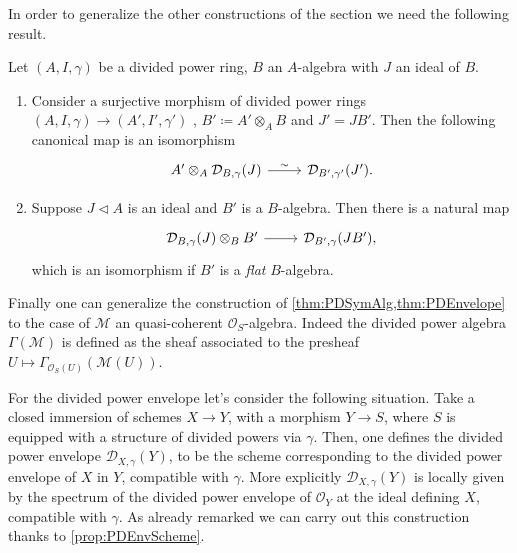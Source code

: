 \noindent
In order to generalize the other constructions of the section
we need the following result.


\begin{prop}\label{prop:PDEnvScheme}
	Let $\left(A, I, \gamma\right)$ be a divided power ring, $B$
	an $A$-algebra with $J$ an ideal of $B$.
\begin{enumerate}
	\item Consider a surjective morphism of divided power rings
		$\left(A, I, \gamma\right) \to  \left(A', I', \gamma'\right)$ ,
		$B' \coloneqq A' \otimes_A B$ and $J' = JB'$.
		Then the following canonical map is an isomorphism
		\begin{equation*}
		\begin{tikzcd}[row sep = 0ex
			,/tikz/column 1/.append style={anchor=base east}
			,/tikz/column 2/.append style={anchor=base west}]
			A' \otimes_A \mathcal{D}_{B,\gamma}(J) \arrow[r, "\sim", rightarrow] &
			\mathcal{D}_{B',\gamma'}(J')
		.\end{tikzcd}
		\end{equation*} 

	\item Suppose $J \triangleleft A$ is an ideal and $B'$ is a $B$-algebra.
		Then there is a natural map
		\begin{equation*}
		\begin{tikzcd}[row sep = 0ex
			,/tikz/column 1/.append style={anchor=base east}
			,/tikz/column 2/.append style={anchor=base west}]
			\mathcal{D}_{B,\gamma}(J) \otimes_B B' \arrow[r, "", rightarrow] &
			\mathcal{D}_{B',\gamma}(JB')
		,\end{tikzcd}
		\end{equation*} 
		which is an isomorphism if $B'$ is a \emph{flat} $B$-algebra.
\end{enumerate}
\end{prop}


\begin{rem}[]
	Finally one can generalize the construction
	of \cref{thm:PDSymAlg,thm:PDEnvelope} to the case of $\mathcal{M}$
	an quasi-coherent $\mathcal{O}_{ S }$-algebra.
	Indeed the divided power algebra $\Gamma(\mathcal{M})$ is defined
	as the sheaf associated to the presheaf 
	$U \mapsto \Gamma_{\mathcal{O}_S(U)}(\mathcal{M}(U))$.

	For the divided power envelope let's consider the following situation.
	Take a closed immersion of schemes $X \to Y$, with a morphism $Y \to S$,
	where $S$ is equipped with a structure of divided powers via $\gamma$.
	Then, one defines the
	divided power envelope $\mathcal{D}_{X,\gamma}(Y)$, to be the scheme
	corresponding to the divided power envelope of $X$ in $Y$,
	compatible with $\gamma$.
	More explicitly $\mathcal{D}_{X,\gamma}(Y)$ is locally 
	given by the spectrum of the divided power envelope
	of $\mathcal{O}_{ Y }$ at the ideal defining $X$, compatible with $\gamma$.
	As already remarked we can carry out this construction
	thanks to \cref{prop:PDEnvScheme}.
\end{rem}


